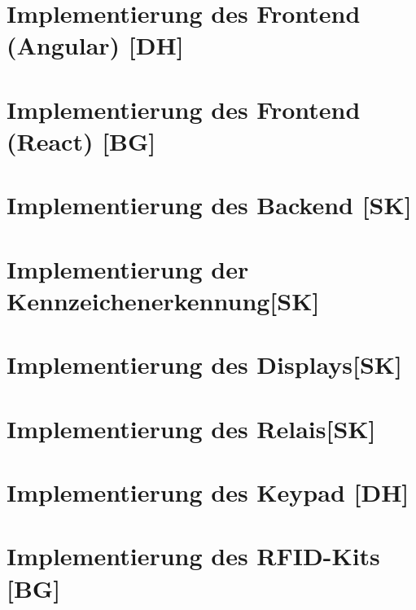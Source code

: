 \section{Implementierung des Frontend (Angular) [DH]}

\section{Implementierung des Frontend (React) [BG]}

\section{Implementierung des Backend [SK]}

\section{Implementierung der Kennzeichenerkennung[SK]}

\section{Implementierung des Displays[SK]}

\section{Implementierung des Relais[SK]}

\section{Implementierung des Keypad [DH]}

\section{Implementierung des RFID-Kits [BG]}
